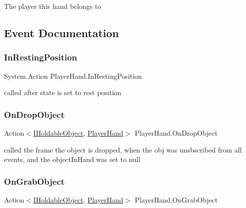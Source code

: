 The player this hand belongs to 



\subsection{Event Documentation}
\mbox{\label{class_player_hand_aebb1dc8370e71ba7b9965ffa0d4a2532}} 
\subsubsection{\texorpdfstring{In\+Resting\+Position}{InRestingPosition}}
{\footnotesize\ttfamily System.\+Action Player\+Hand.\+In\+Resting\+Position}



called after state is set to rest position 

\mbox{\label{class_player_hand_ac22e288fe18167393a51eec5ad0cbfc0}} 
\subsubsection{\texorpdfstring{On\+Drop\+Object}{OnDropObject}}
{\footnotesize\ttfamily Action$<$\mbox{\hyperlink{interface_i_holdable_object}{I\+Holdable\+Object}}, \mbox{\hyperlink{class_player_hand}{Player\+Hand}}$>$ Player\+Hand.\+On\+Drop\+Object}



called the frame the object is dropped, when the obj was unsbscribed from all events, and the object\+In\+Hand was set to null 

\mbox{\label{class_player_hand_af3875f350ce765612b5af99e8e9d5837}} 
\subsubsection{\texorpdfstring{On\+Grab\+Object}{OnGrabObject}}
{\footnotesize\ttfamily Action$<$\mbox{\hyperlink{interface_i_holdable_object}{I\+Holdable\+Object}}, \mbox{\hyperlink{class_player_hand}{Player\+Hand}}$>$ Player\+Hand.\+On\+Grab\+Object}



